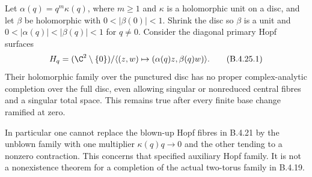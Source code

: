 \begin{proposition}\label{push:src:B.4.25}
\label{push:B425}
Let $\alpha(q)=q^m\kappa(q)$, where $m\ge1$ and
$\kappa$ is a holomorphic unit on a disc, and let $\beta$
be holomorphic with $0<|\beta(0)|<1$. Shrink the disc so
$\beta$ is a unit and $0<|\alpha(q)|<|\beta(q)|<1$ for
$q\ne0$. Consider the diagonal primary Hopf surfaces
\[
 H_q=(\C^2\setminus\{0\})/
       \langle(z,w)\mapsto(\alpha(q)z,\beta(q)w)\rangle.
                                                        \tag{B.4.25.1}
\]
Their holomorphic family over the punctured disc has no
proper complex-analytic completion over the full disc,
even allowing singular or nonreduced central fibres and
a singular total space. This remains true after every
finite base change ramified at zero.

In particular one cannot replace the blown-up Hopf
fibres in B.4.21 by the unblown family with one multiplier
$\kappa(q)q\to0$ and the other tending to a nonzero
contraction. This concerns that specified auxiliary
Hopf family. It is not a nonexistence theorem for a
completion of the actual two-torus family in B.4.19.
\end{proposition}
